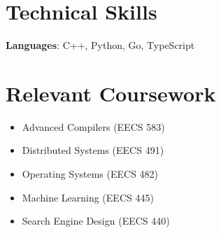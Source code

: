 \documentclass[letterpaper,11pt]{article}
\makeatletter
\newcommand{\resumeItem}[1]{
  \item\small{
    {#1 \vspace{-2pt}}
  }
}
\newcommand{\resumeProjectHeading}[2]{
    \item
    \begin{tabular*}{0.97\textwidth}{l@{\extracolsep{\fill}}r}
      \small#1 & #2 \\
    \end{tabular*}\vspace{-7pt}
}
\newcommand{\resumeSubHeadingListStart}{\begin{itemize}[leftmargin=0.15in, label={}]}
\newcommand{\resumeSubHeadingListEnd}{\end{itemize}}
\newcommand{\resumeItemListStart}{\begin{itemize}}
\newcommand{\resumeItemListEnd}{\end{itemize}\vspace{-5pt}}
\makeatother
\begin{document}

%
\section{Technical Skills}
\begin{itemize}[leftmargin=0.15in, label={}]
  \small{\item{
                \textbf{Languages}{: C++, Python, Go, TypeScript}
          }}
\end{itemize}

%
\section{Relevant Coursework}
\resumeItemListStart{}
\resumeItem{Advanced Compilers (EECS 583)}
\resumeItem{Distributed Systems (EECS 491)}
\resumeItem{Operating Systems (EECS 482)}
\resumeItem{Machine Learning (EECS 445)}
\resumeItem{Search Engine Design (EECS 440)}
\resumeItemListEnd{}


\end{document}
